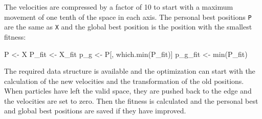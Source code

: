 \documentclass[
  oneside]{book}
\newenvironment{Shaded}{\begin{snugshade}}{\end{snugshade}}
\newcommand{\AttributeTok}[1]{\textcolor[rgb]{0.77,0.63,0.00}{#1}}
\newcommand{\ControlFlowTok}[1]{\textcolor[rgb]{0.13,0.29,0.53}{\textbf{#1}}}
\newcommand{\DecValTok}[1]{\textcolor[rgb]{0.00,0.00,0.81}{#1}}
\newcommand{\FunctionTok}[1]{\textcolor[rgb]{0.00,0.00,0.00}{#1}}
\newcommand{\NormalTok}[1]{#1}
\newcommand{\OtherTok}[1]{\textcolor[rgb]{0.56,0.35,0.01}{#1}}
\newcommand{\SpecialCharTok}[1]{\textcolor[rgb]{0.00,0.00,0.00}{#1}}
\begin{document}
\begin{Shaded}
\end{Shaded}

The velocities are compressed by a factor of 10 to start with a maximum movement of one tenth of the space in each axis. The personal best positions \texttt{P} are the same as \texttt{X} and the global best position is the position with the smallest fitness:

\begin{Shaded}
\begin{Highlighting}[]
\NormalTok{P }\OtherTok{\textless{}{-}}\NormalTok{ X}
\NormalTok{P\_fit }\OtherTok{\textless{}{-}}\NormalTok{ X\_fit}
\NormalTok{p\_g }\OtherTok{\textless{}{-}}\NormalTok{ P[, }\FunctionTok{which.min}\NormalTok{(P\_fit)]}
\NormalTok{p\_g\_fit }\OtherTok{\textless{}{-}} \FunctionTok{min}\NormalTok{(P\_fit)}
\end{Highlighting}
\end{Shaded}

The required data structure is available and the optimization can start with the calculation of the new velocities and the transformation of the old positions. When particles have left the valid space, they are pushed back to the edge and the velocities are set to zero. Then the fitness is calculated and the personal best and global best positions are saved if they have improved.
\end{document}
